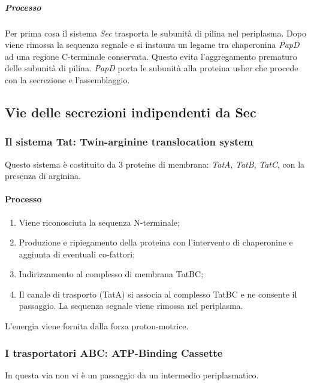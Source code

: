 				\subparagraph{Processo}
				Per prima cosa il sistema \emph{Sec} trasporta le subunit\`a di pilina nel periplasma. 
				Dopo viene rimossa la sequenza segnale e si instaura un legame tra chaperonina \emph{PapD} ad una regione C-terminale conservata. 
				Questo evita l'aggregamento prematuro delle subunit\`a di pilina. 
				\emph{PapD} porta le subunit\`a alla proteina usher che procede con la secrezione e l'assemblaggio.

	\subsection{Vie delle secrezioni indipendenti da Sec}

		\subsubsection{Il sistema Tat: Twin-arginine translocation system}
		Questo sistema \`e costituito da 3 proteine di membrana: \emph{TatA}, \emph{TatB}, \emph{TatC}, con la presenza di arginina. 

			\paragraph{Processo}
			\begin{multicols}{2}
				\begin{enumerate}
    					\item Viene riconosciuta la sequenza N-terminale; 
    					\item Produzione e ripiegamento della proteina con l'intervento di chaperonine e aggiunta di eventuali co-fattori; 
    					\item Indirizzamento al complesso di membrana TatBC; 
    					\item Il canale di trasporto  (TatA) si associa al complesso TatBC e ne consente il passaggio. 
						La sequenza segnale viene rimossa nel periplasma. 
				\end{enumerate}
			\end{multicols}
			L'energia viene fornita dalla forza proton-motrice. 

		\subsubsection{I trasportatori ABC: ATP-Binding Cassette}
		In questa via non vi \`e un passaggio da un intermedio periplasmatico. 
		
